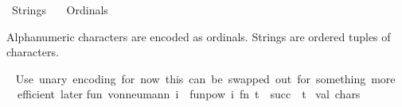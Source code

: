 %
\begin{isabellebody}%
%
%
\isadelimdocument
%
\endisadelimdocument
%
\isatagdocument
\isanewline
\isanewline
%
\isamarkuptrue%
%
\endisatagdocument
{\isafolddocument}%
%
\isadelimdocument
%
\endisadelimdocument
%
\isadelimtheory
%
\endisadelimtheory
%
\isatagtheory
{}\isamarkupfalse%
\ Strings\isanewline
\ \ \ Ordinals\isanewline
{}%
\endisatagtheory
{\isafoldtheory}%
%
\isadelimtheory
%
\endisadelimtheory
%
\begin{isamarkuptext}%
Alphanumeric characters are encoded as ordinals. Strings are ordered tuples of
characters.%
\end{isamarkuptext}\isamarkuptrue%
%
\isadelimdocument
%
\endisadelimdocument
%
\isatagdocument
%
\isamarkuptrue%
%
\endisatagdocument
{\isafolddocument}%
%
\isadelimdocument
%
\endisadelimdocument
%
\isadelimML
%
\endisadelimML
%
\isatagML
{}\isamarkupfalse%
\ {\isacartoucheopen}\isanewline
{\isacharparenleft}{\kern0pt}{\isacharasterisk}{\kern0pt}Use\ unary\ encoding\ for\ now{\isacharsemicolon}{\kern0pt}\ this\ can\ be\ swapped\ out\ for\ something\ more\isanewline
\ \ efficient\ later{\isachardot}{\kern0pt}{\isacharasterisk}{\kern0pt}{\isacharparenright}{\kern0pt}\isanewline
fun\ von{\isacharunderscore}{\kern0pt}neumann\ i\ {\isacharequal}{\kern0pt}\ funpow\ i\ {\isacharparenleft}{\kern0pt}fn\ t\ {\isacharequal}{\kern0pt}{\isachargreater}{\kern0pt}\ \isactrlconst {\isasymopen}succ{\isasymclose}\ {\isachardollar}{\kern0pt}\ t{\isacharparenright}{\kern0pt}\ \isactrlterm {\isasymopen}{\isacharbraceleft}{\kern0pt}{\isacharbraceright}{\kern0pt}{\isasymclose}\isanewline
\isanewline
val\ chars\ {\isacharequal}{\kern0pt}\isanewline
\ \ {\isacharbrackleft}{\kern0pt}{\isachardoublequote}{\kern0pt}{}{\isachardoublequote}{\kern0pt}{\isacharcomma}{\kern0pt}{\isachardoublequote}{\kern0pt}{}{\isachardoublequote}{\kern0pt}{\isacharcomma}{\kern0pt}{\isachardoublequote}{\kern0pt}{}{\isachardoublequote}{\kern0pt}{\isacharcomma}{\kern0pt}{\isachardoublequote}{\kern0pt}{}{\isachardoublequote}{\kern0pt}{\isacharcomma}{\kern0pt}{\isachardoublequote}{\kern0pt}{}{\isachardoublequote}{\kern0pt}{\isacharcomma}{\kern0pt}{\isachardoublequote}{\kern0pt}{}{\isachardoublequote}{\kern0pt}{\isacharcomma}{\kern0pt}{\isachardoublequote}{\kern0pt}{}{\isachardoublequote}{\kern0pt}{\isacharcomma}{\kern0pt}{\isachardoublequote}{\kern0pt}{}{\isachardoublequote}{\kern0pt}{\isacharcomma}{\kern0pt}{\isachardoublequote}{\kern0pt}{}{\isachardoublequote}{\kern0pt}{\isacharcomma}{\kern0pt}{\isachardoublequote}{\kern0pt}{}{\isachardoublequote}{\kern0pt}{\isacharcomma}{\kern0pt}\isanewline

\end{isabellebody}
